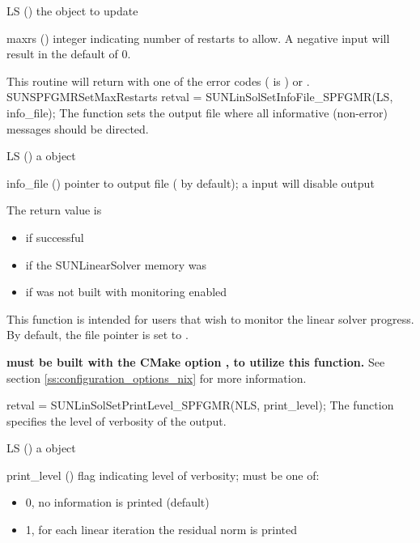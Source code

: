 {
  \begin{args}[maxrs]
  \item[LS] ()
    the {\sunlinsolspfgmr} object to update
  \item[maxrs] ()
    integer indicating number of restarts to allow.  A negative input
    will result in the default of 0.
  \end{args}
}
{
  This routine will return with one of the error codes
   ( is ) or .
}
{}
{SUNSPFGMRSetMaxRestarts}
%
%
{
  retval = SUNLinSolSetInfoFile\_SPFGMR(LS, info\_file);
}
{
  The function  sets the
  output file where all informative (non-error) messages should be directed.
}
{
  \begin{args}
    \item[LS] ()
      a {\sunnonlinsol} object
    \item[info\_file] () pointer to output file ( by default);
      a  input will disable output
  \end{args}
}
{
  The return value is
  \begin{itemize}
    \item {} if successful
    \item {} if the SUNLinearSolver memory was 
    \item {} if {\sundials} was not built with monitoring enabled
  \end{itemize}
}
{
  This function is intended for users that wish to monitor the linear
  solver progress. By default, the file pointer is set to .

  \textbf{{\sundials} must be built with the CMake option
  , to utilize this function.}
  See section \ref{ss:configuration_options_nix} for more information.
}
%
%
{
  retval = SUNLinSolSetPrintLevel\_SPFGMR(NLS, print\_level);
}
{
  The function  specifies the level
  of verbosity of the output.
}
{
  \begin{args}
  \item[LS] ()
    a {\sunnonlinsol} object
  \item[print\_level] () flag indicating level of verbosity;
    must be one of:
    \begin{itemize}
      \item 0, no information is printed (default)
      \item 1, for each linear iteration the residual norm is printed
    \end{itemize}
  \end{args}
}
